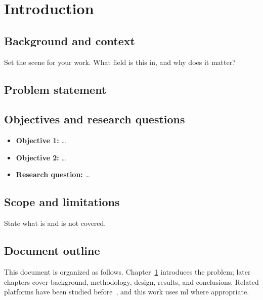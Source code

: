 \chapter{Introduction}
\label{ch:introduction}

\section{Background and context}
Set the scene for your work. What field is this in, and why does it matter?

\section{Problem statement}

\section{Objectives and research questions}
\begin{itemize}
  \item \textbf{Objective 1:} \ldots
  \item \textbf{Objective 2:} \ldots
  \item \textbf{Research question:} \ldots
\end{itemize}

\section{Scope and limitations}
State what is and is not covered.

\section{Document outline}
This document is organized as follows. Chapter~\ref{ch:introduction} introduces
the problem; later chapters cover background, methodology, design, results, and
conclusions. Related platforms have been studied before~\citep{example2020}, and
this work uses \gls{ml} where appropriate.
